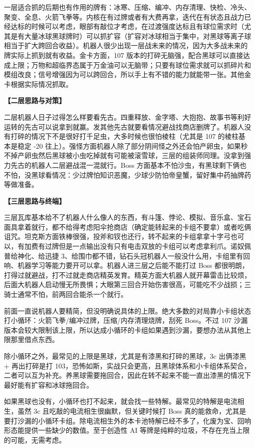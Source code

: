 ﻿\documentclass[12pt, a4paper]{article}
\begin{document}
一层适合抓的后期也有作用的牌有：冰寒、压缩、编冲、内存清理、快检、冷头、聚变、全息、火箭飞拳等。内核在有过牌或者有大费再拿，迭代在有状态且战力已经达标的时候可以考虑，眼部有敲位才考虑，在过渡强度达标且有球位需求时（尤其是有大量冰球黑球牌时）可以抓扩容（扩容对冰球相当于集中，对黑球等离子球相当于扩大跨回合收益）。机器人很少出现一层战未来的情况，因为大多战未来的牌实际上抓到就有收益。金卡方面，107 版本的打碎无脑强，配合黑球可以直接达成上限；万物和超临界态属于万金油可以无脑带；只要有球位需求就可以抓碎片和模组改良；信号增强因为可以跨回合，所以手上有不错的能力就能带一张。其他金卡根据实际情况抓取。

\textbf{【二层思路与对策】}

二层机器人日子过得怎么样要看先古。四重释放、金字塔、大抱抱、故事书等利好运转的先古可以说拿到就赢。发其他先古就要看情况避战找商店删牌了。机器人没有打碎的情况下不是很好打千足虫，大多时候也很怕棱柱（尤其是 107 的棱柱基本是稳定 -20 往上）。强怪方面机器人除了部分阴间怪之外还会怕产卵虫，如果秒不掉产卵虫然后黑球被小虫吃掉就有可能被滚雪球，三层的组装师同理。没拿到强力先古的机器人二层避战混一混就行。Boss 方面基本不怕沙虫，有黑球剩下俩也不怕，没黑球看情况：少过牌怕知识恶魔，少球少防怕帝皇蟹，留好集中药抽牌药等做准备。

\textbf{【三层思路与终端】}

三层瓦库基本给不了机器人什么像人的东西，有斗篷、悖论、模拟、音乐盒、宝石面具拿着就行，都不给得考虑阳伞抢商店（确定能转起来的卡组不要拿）或者吃俩诅咒。坦克斯方面铁棒很强，投斧和钗也还行，转不起来的卡组拿拿十字弓也可以，有加费有过牌但是一点输出没有只有电击双放的卡组可以考虑拿利爪。诺奴佩普给神化、给迅捷 3、给围巾都不错，钻石头冠机器人一般没什么用，卡组里有回响、机器学习等能力要开可以拿。机器人进三层之后能不能打过 Boss 都很明朗，打得过就避战，打不过就走商店精英发育。精英方面大机器人就开幕雷击比较烦，后面大机器人启动慢无所畏惧；大眼第三回合开始伤害很高，可能吃不少战损；三骑士通常不怕，前两回合能杀一个就行。

前面一直说机器人要精简，但没明确说具体的上限。绝大多数的对局靠小卡组状态打小循环：火箭飞拳/编冲过牌，压缩/内存清理烧牌，刮死 Boss。不过 107 沙漏版本会较大限制该上限，所以达成小循环的卡组如果遇到沙漏，要想办法从其他上限那里借点东西。

除小循环之外，最常见的上限是黑球，尤其是有漆黑和打碎的黑球，3c 出俩漆黑+ 再出打碎是打 103，恐怖如斯，实战只会更高，且黑球体系和小卡组体系契合，二者可以互为补充。养黑球需要拖回合，因此在转不起来不能一直出漆黑的情况下最好能有扩容和冰球拖回合。

如果黑球也没有，小循环也打不起来，就会找一些特解。最常见的特解是电流相生，虽然 3c 且吃敲的电流相生很幽默，但关键时候打 Boss 真的能救命，尤其是要打沙漏的小循环卡组。除电流相生外的本卡池特解已经不多了，化废为宝、回响形态能提供一些缺少的数值。至于创造性 AI 等牌是纯粹的垃圾，不存在充当上限的可能，无需考虑。
\end{document}
